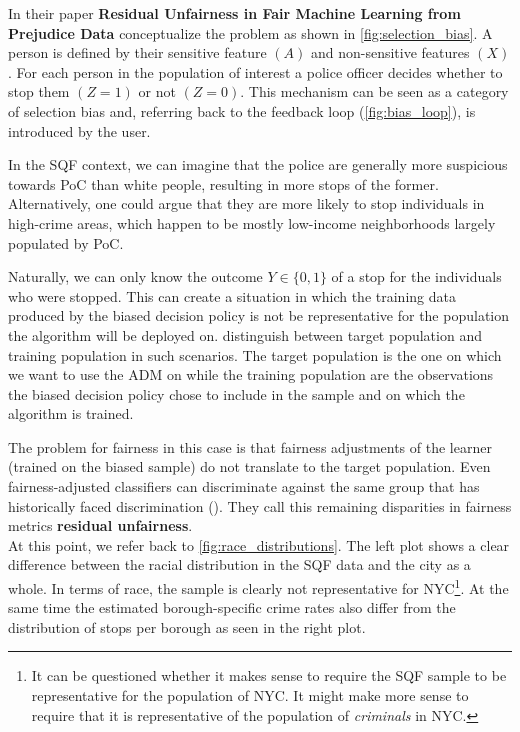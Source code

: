 In their paper \textbf{Residual Unfairness in Fair Machine Learning from Prejudice Data} \cite{kallus2018} conceptualize the problem as shown in \autoref{fig:selection_bias}.
A person is defined by their sensitive feature $(A)$ and non-sensitive features $(X)$. For each person in the population of interest a police officer decides whether to stop them $(Z = 1)$ or not $(Z = 0)$. This mechanism can be seen as a category of selection bias and, referring back to the feedback loop (\autoref{fig:bias_loop}), is introduced by the user.\par
In the SQF context, we can imagine that the police are generally more suspicious towards PoC than white people, resulting in more stops of the former. Alternatively, one could argue that they are more likely to stop individuals in high-crime areas, which happen to be mostly low-income neighborhoods largely populated by PoC.\par
Naturally, we can only know the outcome $Y \in \{0, 1\}$ of a stop for the individuals who were stopped. This can create a situation in which the training data produced by the biased decision policy is not be representative for the population the algorithm will be deployed on.
\cite{kallus2018} distinguish between target population and training population in such scenarios. The target population is the one on which we want to use the ADM on while the training population are the observations the biased decision policy chose to include in the sample and on which the algorithm is trained.\par
The problem for fairness in this case is that fairness adjustments of the learner (trained on the biased sample) do not translate to the target population. Even fairness-adjusted classifiers can discriminate against the same group that has historically faced discrimination (\cite{kallus2018}). They call this remaining disparities in fairness metrics \textbf{residual unfairness}.\\
At this point, we refer back to \autoref{fig:race_distributions}. The left plot shows a clear difference between the racial distribution in the SQF data and the city as a whole. In terms of race, the sample is clearly not representative for NYC\footnote{It can be questioned whether it makes sense to require the SQF sample to be representative for the population of NYC. It might make more sense to require that it is representative of the population of \textit{criminals} in NYC.}. At the same time the estimated borough-specific crime rates also differ from the distribution of stops per borough as seen in the right plot.\par
